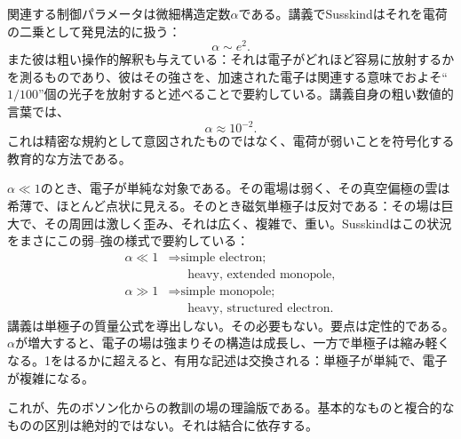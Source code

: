 関連する制御パラメータは微細構造定数\(\alpha\)である。講義でSusskindはそれを電荷の二乗として発見法的に扱う：
\begin{equation}
\alpha \sim e^2.
\end{equation}
また彼は粗い操作的解釈も与えている：それは電子がどれほど容易に放射するかを測るものであり、彼はその強さを、加速された電子は関連する意味でおよそ``\(1/100\)''個の光子を放射すると述べることで要約している。講義自身の粗い数値的言葉では、
\begin{equation}
\alpha \approx 10^{-2}.
\end{equation}
これは精密な規約として意図されたものではなく、電荷が弱いことを符号化する教育的な方法である。


\(\alpha\ll 1\)のとき、電子が単純な対象である。その電場は弱く、その真空偏極の雲は希薄で、ほとんど点状に見える。そのとき磁気単極子は反対である：その場は巨大で、その周囲は激しく歪み、それは広く、複雑で、重い。Susskindはこの状況をまさにこの弱--強の様式で要約している：
\begin{equation}
\begin{aligned}
\alpha \ll 1
&\Rightarrow \text{simple electron;}\\
&\phantom{\Rightarrow{}}\text{heavy, extended monopole},\\
\alpha \gg 1
&\Rightarrow \text{simple monopole;}\\
&\phantom{\Rightarrow{}}\text{heavy, structured electron}.
\end{aligned}
\end{equation}
講義は単極子の質量公式を導出しない。その必要もない。要点は定性的である。\(\alpha\)が増大すると、電子の場は強まりその構造は成長し、一方で単極子は縮み軽くなる。1をはるかに超えると、有用な記述は交換される：単極子が単純で、電子が複雑になる。

これが、先のボソン化からの教訓の場の理論版である。基本的なものと複合的なものの区別は絶対的ではない。それは結合に依存する。

\begin{classroomqa}
\end{classroomqa}

